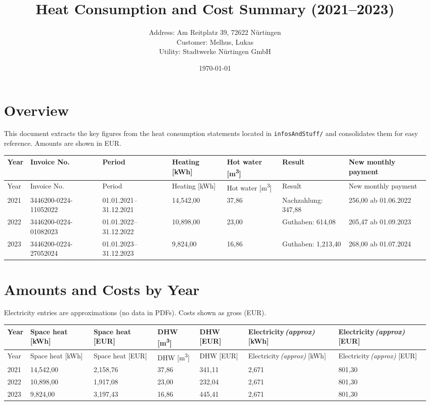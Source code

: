 \documentclass[11pt,a4paper]{article}
\title{Heat Consumption and Cost Summary (2021--2023)}
\author{Address: Am Reitplatz 39, 72622 Nürtingen\\Customer: Melhus, Lukas\\Utility: Stadtwerke Nürtingen GmbH}
\date{\today}
\begin{document}
\maketitle

\section*{Overview}
\noindent This document extracts the key figures from the heat consumption statements located in \texttt{infosAndStuff/} and consolidates them for easy reference. Amounts are shown in EUR.

\bigskip
\begin{longtable}{@{}>{\raggedright}p{1.2cm}p{4.2cm}p{5.0cm}p{2.6cm}p{2.6cm}p{3.2cm}p{3.0cm}@{}}
\toprule
Year & Invoice No. & Period & Heating [kWh] & Hot water [m\textsuperscript{3}] & Result & New monthly payment \\
\midrule
\endfirsthead
\toprule
Year & Invoice No. & Period & Heating [kWh] & Hot water [m\textsuperscript{3}] & Result & New monthly payment \\
\midrule
\endhead
2021 & 3446200-0224-11052022 & 01.01.2021--31.12.2021 & 14{,}542{,}00 & 37{,}86 & Nachzahlung: 347{,}88 & 256{,}00 ab 01.06.2022 \\
2022 & 3446200-0224-01082023 & 01.01.2022--31.12.2022 & 10{,}898{,}00 & 23{,}00 & Guthaben: 614{,}08 & 205{,}47 ab 01.09.2023 \\
2023 & 3446200-0224-27052024 & 01.01.2023--31.12.2023 & 9{,}824{,}00 & 16{,}86 & Guthaben: 1{,}213{,}40 & 268{,}00 ab 01.07.2024 \\
\bottomrule
\end{longtable}

\section*{Amounts and Costs by Year}
\noindent Electricity entries are approximations (no data in PDFs). Costs shown as gross (EUR).

\begin{longtable}{@{}>{\raggedright}p{1.2cm}p{3.0cm}p{3.2cm}p{3.0cm}p{3.2cm}p{3.2cm}p{3.2cm}@{}}
\toprule
Year & Space heat [kWh] & Space heat [EUR] & DHW [m\textsuperscript{3}] & DHW [EUR] & Electricity\,\emph{(approx)} [kWh] & Electricity\,\emph{(approx)} [EUR] \\
\midrule
\endfirsthead
\toprule
Year & Space heat [kWh] & Space heat [EUR] & DHW [m\textsuperscript{3}] & DHW [EUR] & Electricity\,\emph{(approx)} [kWh] & Electricity\,\emph{(approx)} [EUR] \\
\midrule
\endhead
2021 & 14{,}542{,}00 & 2{,}158{,}76 & 37{,}86 & 341{,}11 & 2{,}671 & 801{,}30 \\
2022 & 10{,}898{,}00 & 1{,}917{,}08 & 23{,}00 & 232{,}04 & 2{,}671 & 801{,}30 \\
2023 & 9{,}824{,}00  & 3{,}197{,}43 & 16{,}86 & 445{,}41 & 2{,}671 & 801{,}30 \\
\bottomrule
\end{longtable}
\end{document}
